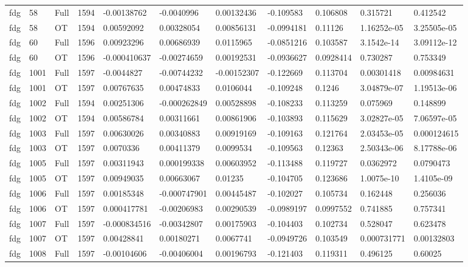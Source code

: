 \begin{landscape}
\begin{longtable}{lllllllllll}
fdg & 58 & Full & 1594 & -0.00138762 & -0.0040996 & 0.00132436 & -0.109583 & 0.106808 & 0.315721 & 0.412542 \\
fdg & 58 & OT & 1594 & 0.00592092 & 0.00328054 & 0.00856131 & -0.0994181 & 0.11126 & 1.16252e-05 & 3.25505e-05 \\
fdg & 60 & Full & 1596 & 0.00923296 & 0.00686939 & 0.0115965 & -0.0851216 & 0.103587 & 3.1542e-14 & 3.09112e-12 \\
fdg & 60 & OT & 1596 & -0.000410637 & -0.00274659 & 0.00192531 & -0.0936627 & 0.0928414 & 0.730287 & 0.753349 \\
fdg & 1001 & Full & 1597 & -0.0044827 & -0.00744232 & -0.00152307 & -0.122669 & 0.113704 & 0.00301418 & 0.00984631 \\
fdg & 1001 & OT & 1597 & 0.00767635 & 0.00474833 & 0.0106044 & -0.109248 & 0.1246 & 3.04879e-07 & 1.19513e-06 \\
fdg & 1002 & Full & 1594 & 0.00251306 & -0.000262849 & 0.00528898 & -0.108233 & 0.113259 & 0.075969 & 0.148899 \\
fdg & 1002 & OT & 1594 & 0.00586784 & 0.00311661 & 0.00861906 & -0.103893 & 0.115629 & 3.02827e-05 & 7.06597e-05 \\
fdg & 1003 & Full & 1597 & 0.00630026 & 0.00340883 & 0.00919169 & -0.109163 & 0.121764 & 2.03453e-05 & 0.000124615 \\
fdg & 1003 & OT & 1597 & 0.0070336 & 0.00411379 & 0.0099534 & -0.109563 & 0.12363 & 2.50343e-06 & 8.17788e-06 \\
fdg & 1005 & Full & 1597 & 0.00311943 & 0.000199338 & 0.00603952 & -0.113488 & 0.119727 & 0.0362972 & 0.0790473 \\
fdg & 1005 & OT & 1597 & 0.00949035 & 0.00663067 & 0.01235 & -0.104705 & 0.123686 & 1.0075e-10 & 1.4105e-09 \\
fdg & 1006 & Full & 1597 & 0.00185348 & -0.000747901 & 0.00445487 & -0.102027 & 0.105734 & 0.162448 & 0.256036 \\
fdg & 1006 & OT & 1597 & 0.000417781 & -0.00206983 & 0.00290539 & -0.0989197 & 0.0997552 & 0.741885 & 0.757341 \\
fdg & 1007 & Full & 1597 & -0.000834516 & -0.00342807 & 0.00175903 & -0.104403 & 0.102734 & 0.528047 & 0.623478 \\
fdg & 1007 & OT & 1597 & 0.00428841 & 0.00180271 & 0.0067741 & -0.0949726 & 0.103549 & 0.000731771 & 0.00132803 \\
fdg & 1008 & Full & 1597 & -0.00104606 & -0.00406004 & 0.00196793 & -0.121403 & 0.119311 & 0.496125 & 0.60025 \\

\end{longtable}
\end{landscape}
